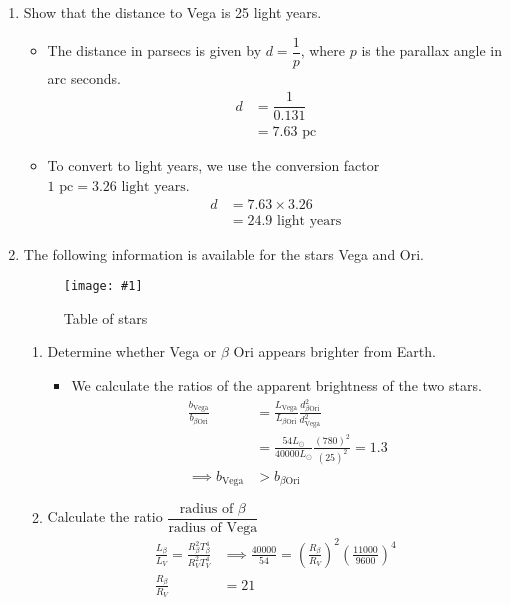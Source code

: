 \documentclass[a4paper,12pt]{article}
\newcommand{\img}[4]{\begin{center}
  \begin{figure}[H]
    \centering
    \texttt{[image: \#1]}
    \caption{#3}
    \label{fig:#4}
  \end{figure}
\end{center}}
\begin{document}
\begin{enumerate}[label=(\alph*)]
  \item Show that the distance to Vega is 25 light years.
        \begin{itemize}
          \item The distance in parsecs is given by $d = \dfrac{1}{p}$, where $p$ is the parallax angle in arc seconds.
                \begin{align*}
                  d & = \dfrac{1}{0.131} \\
                    & = 7.63 \text{ pc}
                \end{align*}
          \item To convert to light years, we use the conversion factor $1 \text{ pc} = 3.26 \text{ light years}$.
                \begin{align*}
                  d & = 7.63 \times 3.26         \\
                    & = 24.9 \text{ light years}
                \end{align*}
        \end{itemize}
  \item The following information is available for the stars Vega and Ori.
        \img{ex/2.png}{0.6}{Table of stars}{ex2}
        \begin{enumerate}[label=(\roman*)]
          \item Determine whether Vega or $\beta$ Ori appears brighter from Earth.
                \begin{itemize}
                  \item We calculate the ratios of the apparent brightness of the two stars.
                        \begin{align*}
                          \frac{b_{\text{Vega}}}{b_{\beta \text{Ori}}} & = \frac{L_{\text{Vega}}}{L_{\beta \text{Ori}}}\frac{d_{\beta \text{Ori}}^2}{d_{\text{Vega}}^2} \\
                                                                       & = \frac{54L_\odot}{40000L_\odot}\frac{(780)^2}{(25)^2} = 1.3                                   \\
                          \implies b_{\text{Vega}}                     & > b_{\beta \text{Ori}}
                        \end{align*}

                \end{itemize}
          \item Calculate the ratio $\dfrac{\text{radius of } \beta}{\text{radius of Vega}}$
                \begin{align*}
                  \frac{L_\beta}{L_V} = \frac{R_\beta^2T_\beta^4}{R_V^2T_V^4} & \implies \frac{40000}{54} =  \left(\frac{R_\beta}{R_V}\right)^2\left(\frac{11000}{9600}\right)^4 \\\frac{ R_\beta}{R_V} &=21
                \end{align*}
        \end{enumerate}


\end{enumerate}
\end{document}
